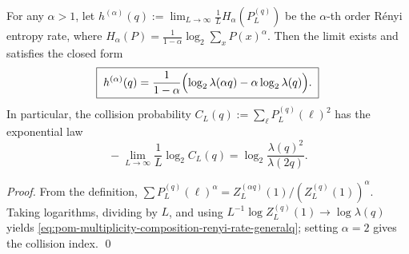 \begin{proposition}\label{prop:pom-multiplicity-composition-renyi-collision-generalq}
For any \(\alpha>1\), let
\(
h^{(\alpha)}(q):=\lim_{L\to\infty}\frac{1}{L}H_\alpha(P_L^{(q)})
\)
be the \(\alpha\)-th order R\'enyi entropy rate, where
\(
H_\alpha(P)=\frac{1}{1-\alpha}\log_2\sum_x P(x)^\alpha
\).
Then the limit exists and satisfies the closed form
\begin{equation}\label{eq:pom-multiplicity-composition-renyi-rate-generalq}
\boxed{\;
h^{(\alpha)}(q)=\frac{1}{1-\alpha}\Bigl(\log_2\lambda(\alpha q)-\alpha\log_2\lambda(q)\Bigr).\;}
\end{equation}
In particular, the collision probability
\(
C_L(q):=\sum_{\boldsymbol{\ell}}P_L^{(q)}(\boldsymbol{\ell})^2
\)
has the exponential law
\[
\boxed{\;
-\lim_{L\to\infty}\frac{1}{L}\log_2 C_L(q)=\log_2\frac{\lambda(q)^2}{\lambda(2q)}.\;}
\]
\end{proposition}
\begin{proof}
From the definition,
\(
\sum P_L^{(q)}(\boldsymbol{\ell})^\alpha
=Z_L^{(\alpha q)}(1)/(Z_L^{(q)}(1))^\alpha
\).
Taking logarithms, dividing by \(L\), and using
\(
L^{-1}\log Z_L^{(q)}(1)\to \log\lambda(q)
\)
yields \eqref{eq:pom-multiplicity-composition-renyi-rate-generalq};
setting \(\alpha=2\) gives the collision index. \qed
\end{proof}

